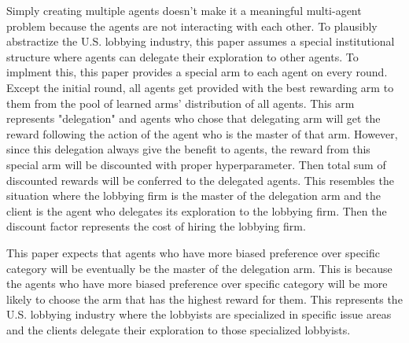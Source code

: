 \documentclass{article}
\begin{document}
Simply creating multiple agents doesn't make it a meaningful multi-agent problem because the agents are not interacting with each other.
To plausibly abstractize the U.S. lobbying industry, this paper assumes a special institutional structure where agents can delegate their exploration to other agents.
To implment this, this paper provides a special arm to each agent on every round. Except the initial round, all agents get provided with the best rewarding arm to them from the pool of learned arms' distribution of all agents. 
This arm represents "delegation" and agents who chose that delegating arm will get the reward following the action of the agent who is the master of that arm. However, since this delegation always give the benefit to agents,
the reward from this special arm will be discounted with proper hyperparameter. Then total sum of discounted rewards will be conferred to the delegated agents. This resembles the situation where the lobbying firm is the master of the delegation arm and the client is the agent who delegates its exploration to the lobbying firm. Then the discount factor represents the cost of hiring the lobbying firm.

This paper expects that agents who have more biased preference over specific category will be eventually be the master of the delegation arm. This is because the agents who have more biased preference over specific category will be more likely to choose the arm that has the highest reward for them. 
This represents the U.S. lobbying industry where the lobbyists are specialized in specific issue areas and the clients delegate their exploration to those specialized lobbyists.
\end{document}
